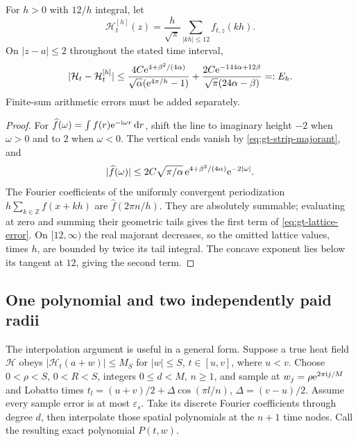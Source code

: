 \begin{proposition}
\label{prop:gt-lattice-payment}
For \(h>0\) with \(12/h\) integral, let
\[
 \mathcal H_t^{[h]}(z)=\frac h{\sqrt\pi}
                    \sum_{|kh|\le12}f_{t,z}(kh).
\]
On \(|z-a|\le2\) throughout the stated time interval,
\begin{equation}
 |\mathcal H_t-\mathcal H_t^{[h]}|
 \le
 \frac{4C\mathrm e^{4+\beta^2/(4\alpha)}}
      {\sqrt\alpha(\mathrm e^{4\pi/h}-1)}
 +\frac{2C\mathrm e^{-144\alpha+12\beta}}
      {\sqrt\pi(24\alpha-\beta)}=:E_h .
 \label{eq:gt-lattice-error}
\end{equation}
Finite-sum arithmetic errors must be added separately.
\end{proposition}
\begin{proof}
For \(\widehat f(\omega)=\int f(r)\mathrm e^{-\mathrm i\omega r}\,\mathrm d r\),
shift the line to imaginary height \(-2\) when \(\omega>0\) and to
\(2\) when \(\omega<0\). The vertical ends vanish by
\eqref{eq:gt-strip-majorant}, and
\[
 |\widehat f(\omega)|\le
 2C\sqrt{\pi/\alpha}\,\mathrm e^{4+\beta^2/(4\alpha)}\mathrm e^{-2|\omega|}.
\]
The Fourier coefficients of the uniformly convergent periodization
\(h\sum_{k\in\mathbb Z}f(x+kh)\) are
\(\widehat f(2\pi n/h)\). They are absolutely summable; evaluating at
zero and summing their geometric tails gives the first term of
\eqref{eq:gt-lattice-error}. On \([12,\infty)\) the real majorant
decreases, so the omitted lattice values, times \(h\), are bounded by
twice its tail integral. The concave exponent lies below its tangent
at \(12\), giving the second term.
\end{proof}

\subsection{One polynomial and two independently paid radii}

The interpolation argument is useful in a general form. Suppose a true
heat field \(\mathcal H\) obeys
\(|\mathcal H_t(a+w)|\le M_S\) for \(|w|\le S\), \(t\in[u,v]\), where \(u<v\).
Choose \(0<\rho<S\), \(0<R<S\), integers \(0\le d<M\), \(n\ge1\), and sample at
\(w_j=\rho\mathrm e^{2\pi\mathrm i j/M}\) and Lobatto times
\(t_l=(u+v)/2+\Delta\cos(\pi l/n)\), \(\Delta=(v-u)/2\).
Assume every sample error is at most \(\varepsilon_s\).
Take its discrete Fourier coefficients through degree \(d\), then
interpolate those spatial polynomials at the \(n+1\) time nodes.
Call the resulting exact polynomial \(P(t,w)\).

